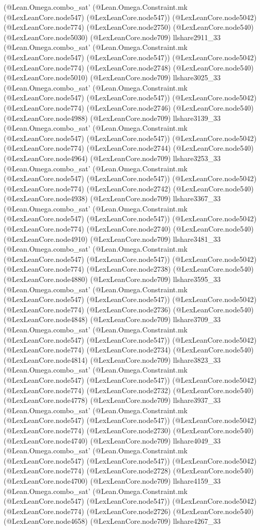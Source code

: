 \documentclass[11pt]{article}
\begin{document}
(@Lean.Omega.combo\_sat' (@Lean.Omega.Constraint.mk (@LexLeanCore.node547) (@LexLeanCore.node547)) (@LexLeanCore.node5042) (@LexLeanCore.node774) (@LexLeanCore.node2750) (@LexLeanCore.node540) (@LexLeanCore.node5030) (@LexLeanCore.node709) llshare2911\_33 (@Lean.Omega.combo\_sat' (@Lean.Omega.Constraint.mk (@LexLeanCore.node547) (@LexLeanCore.node547)) (@LexLeanCore.node5042) (@LexLeanCore.node774) (@LexLeanCore.node2748) (@LexLeanCore.node540) (@LexLeanCore.node5010) (@LexLeanCore.node709) llshare3025\_33 (@Lean.Omega.combo\_sat' (@Lean.Omega.Constraint.mk (@LexLeanCore.node547) (@LexLeanCore.node547)) (@LexLeanCore.node5042) (@LexLeanCore.node774) (@LexLeanCore.node2746) (@LexLeanCore.node540) (@LexLeanCore.node4988) (@LexLeanCore.node709) llshare3139\_33 (@Lean.Omega.combo\_sat' (@Lean.Omega.Constraint.mk (@LexLeanCore.node547) (@LexLeanCore.node547)) (@LexLeanCore.node5042) (@LexLeanCore.node774) (@LexLeanCore.node2744) (@LexLeanCore.node540) (@LexLeanCore.node4964) (@LexLeanCore.node709) llshare3253\_33 (@Lean.Omega.combo\_sat' (@Lean.Omega.Constraint.mk (@LexLeanCore.node547) (@LexLeanCore.node547)) (@LexLeanCore.node5042) (@LexLeanCore.node774) (@LexLeanCore.node2742) (@LexLeanCore.node540) (@LexLeanCore.node4938) (@LexLeanCore.node709) llshare3367\_33 (@Lean.Omega.combo\_sat' (@Lean.Omega.Constraint.mk (@LexLeanCore.node547) (@LexLeanCore.node547)) (@LexLeanCore.node5042) (@LexLeanCore.node774) (@LexLeanCore.node2740) (@LexLeanCore.node540) (@LexLeanCore.node4910) (@LexLeanCore.node709) llshare3481\_33 (@Lean.Omega.combo\_sat' (@Lean.Omega.Constraint.mk (@LexLeanCore.node547) (@LexLeanCore.node547)) (@LexLeanCore.node5042) (@LexLeanCore.node774) (@LexLeanCore.node2738) (@LexLeanCore.node540) (@LexLeanCore.node4880) (@LexLeanCore.node709) llshare3595\_33 (@Lean.Omega.combo\_sat' (@Lean.Omega.Constraint.mk (@LexLeanCore.node547) (@LexLeanCore.node547)) (@LexLeanCore.node5042) (@LexLeanCore.node774) (@LexLeanCore.node2736) (@LexLeanCore.node540) (@LexLeanCore.node4848) (@LexLeanCore.node709) llshare3709\_33 (@Lean.Omega.combo\_sat' (@Lean.Omega.Constraint.mk (@LexLeanCore.node547) (@LexLeanCore.node547)) (@LexLeanCore.node5042) (@LexLeanCore.node774) (@LexLeanCore.node2734) (@LexLeanCore.node540) (@LexLeanCore.node4814) (@LexLeanCore.node709) llshare3823\_33 (@Lean.Omega.combo\_sat' (@Lean.Omega.Constraint.mk (@LexLeanCore.node547) (@LexLeanCore.node547)) (@LexLeanCore.node5042) (@LexLeanCore.node774) (@LexLeanCore.node2732) (@LexLeanCore.node540) (@LexLeanCore.node4778) (@LexLeanCore.node709) llshare3937\_33 (@Lean.Omega.combo\_sat' (@Lean.Omega.Constraint.mk (@LexLeanCore.node547) (@LexLeanCore.node547)) (@LexLeanCore.node5042) (@LexLeanCore.node774) (@LexLeanCore.node2730) (@LexLeanCore.node540) (@LexLeanCore.node4740) (@LexLeanCore.node709) llshare4049\_33 (@Lean.Omega.combo\_sat' (@Lean.Omega.Constraint.mk (@LexLeanCore.node547) (@LexLeanCore.node547)) (@LexLeanCore.node5042) (@LexLeanCore.node774) (@LexLeanCore.node2728) (@LexLeanCore.node540) (@LexLeanCore.node4700) (@LexLeanCore.node709) llshare4159\_33 (@Lean.Omega.combo\_sat' (@Lean.Omega.Constraint.mk (@LexLeanCore.node547) (@LexLeanCore.node547)) (@LexLeanCore.node5042) (@LexLeanCore.node774) (@LexLeanCore.node2726) (@LexLeanCore.node540) (@LexLeanCore.node4658) (@LexLeanCore.node709) llshare4267\_33 
\end{document}
